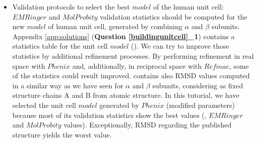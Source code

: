 \begin{itemize}
 \item Validation protocols to select the best $model$ of the human  unit cell:\\
 
 $EMRinger$ and $MolProbity$ validation statistics should be computed for the new $model$ of human  unit cell, generated by combining  $\alpha$ and $\beta$ subunits. Appendix \ref{app:solutions} (\textbf{Question \ref{buildingunitcell}\_1}) contains a statistics table for the unit cell $model$ (). We can try to improve those statistics by additional refinement processes. By performing refinement in real space with $Phenix$ and, additionally, in reciprocal space with $Refmac$, some of the statistics could result improved.  contains also RMSD values computed in a similar way as we have seen for $\alpha$ and $\beta$ subunits, considering as fixed structure chains A and B from  atomic structure. In this tutorial, we have selected the unit cell $model$ generated by $Phenix$  (modified parameters) because most of its validation statistics show the best values (\ccmask, $EMRinger$  and $MolProbity$ values). Exceptionally, RMSD regarding the published structure yields the worst value.
 
\end{itemize}

